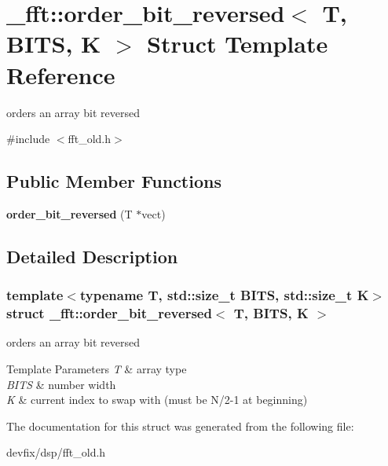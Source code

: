 \hypertarget{struct__fft_1_1order__bit__reversed}{}\section{\+\_\+fft\+:\+:order\+\_\+bit\+\_\+reversed$<$ T, B\+I\+TS, K $>$ Struct Template Reference}
\label{struct__fft_1_1order__bit__reversed}


orders an array bit reversed  




{\ttfamily \#include $<$fft\+\_\+old.\+h$>$}

\subsection*{Public Member Functions}
\begin{DoxyCompactItemize}
\item 
\mbox{\label{struct__fft_1_1order__bit__reversed_aa31dcc8bd387dda7fa2f5b4a18b60730}} 
{\bfseries order\+\_\+bit\+\_\+reversed} (T $\ast$vect)
\end{DoxyCompactItemize}


\subsection{Detailed Description}
\subsubsection*{template$<$typename T, std\+::size\+\_\+t B\+I\+TS, std\+::size\+\_\+t K$>$\newline
struct \+\_\+fft\+::order\+\_\+bit\+\_\+reversed$<$ T, B\+I\+T\+S, K $>$}

orders an array bit reversed 


\begin{DoxyTemplParams}{Template Parameters}
{\em T} & array type \\
\hline
{\em B\+I\+TS} & number width \\
\hline
{\em K} & current index to swap with (must be N/2-\/1 at beginning) \\
\hline
\end{DoxyTemplParams}


The documentation for this struct was generated from the following file\+:\begin{DoxyCompactItemize}
\item 
devfix/dsp/fft\+\_\+old.\+h\end{DoxyCompactItemize}
